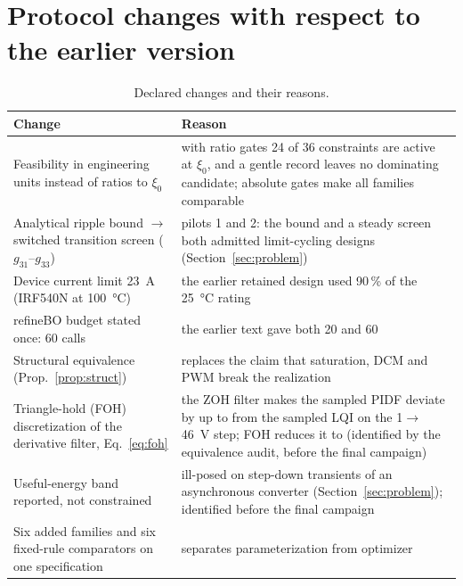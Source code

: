 \section{Protocol changes with respect to the earlier version}\label{app:changes}
\setcounter{table}{0}
\begin{table}[h]
\centering
\footnotesize
\caption{Declared changes and their reasons.}\label{tab:changes}
\begin{tabular}{@{}p{3.6cm}p{4.4cm}@{}}
\toprule
Change & Reason\\
\midrule
Feasibility in engineering units instead of ratios to $\xi_0$ & with ratio gates 24 of 36 constraints are active at $\xi_0$, and a gentle record leaves no dominating candidate; absolute gates make all families comparable\\
Analytical ripple bound $\to$ switched transition screen ($g_{31}$--$g_{33}$) & pilots 1 and 2: the bound and a steady screen both admitted limit-cycling designs (Section~\ref{sec:problem})\\
Device current limit \SI{23}{A} (IRF540N at \SI{100}{\celsius}) & the earlier retained design used 90\,\% of the \SI{25}{\celsius} rating\\
refineBO budget stated once: 60 calls & the earlier text gave both 20 and 60\\
Structural equivalence (Prop.~\ref{prop:struct}) & replaces the claim that saturation, DCM and PWM break the realization\\
Triangle-hold (FOH) discretization of the derivative filter, Eq.~\eqref{eq:foh} & the ZOH filter makes the sampled PIDF deviate by up to \EqSampZOH{} from the sampled LQI on the 1$\to$46~V step; FOH reduces it to \EqSampFOH{} (identified by the equivalence audit, before the final campaign)\\
Useful-energy band reported, not constrained & ill-posed on step-down transients of an asynchronous converter (Section~\ref{sec:problem}); identified before the final campaign\\
Six added families and six fixed-rule comparators on one specification & separates parameterization from optimizer\\
\bottomrule
\end{tabular}
\end{table}
